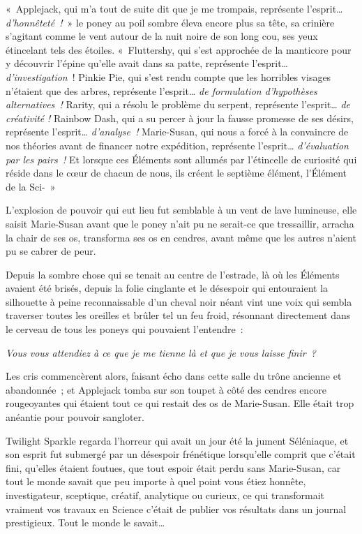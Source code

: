 «~Applejack, qui m'a tout de suite dit que je me trompais, représente l'esprit…
\emph{d'honnêteté~!}~» le poney au poil sombre éleva encore plus sa tête, sa crinière s'agitant comme le vent autour de la nuit noire de son long cou, ses yeux étincelant tels des étoiles.
«~Fluttershy, qui s'est approchée de la manticore pour y découvrir l'épine qu'elle avait dans sa patte, représente l'esprit…
\emph{d'investigation}~!
Pinkie Pie, qui s'est rendu compte que les horribles visages n'étaient que des arbres, représente l'esprit…
\emph{de formulation d'hypothèses alternatives~!} Rarity, qui a résolu le problème du serpent, représente l'esprit…
\emph{de créativité} \emph{!} Rainbow Dash, qui a su percer à jour la fausse promesse de ses désirs, représente l'esprit…
\emph{d'analyse~!} Marie-Susan, qui nous a forcé à la convaincre de nos théories avant de financer notre expédition, représente l'esprit…
\emph{d'évaluation par les pairs~!} Et lorsque ces Éléments sont allumés par l'étincelle de curiosité qui réside dans le cœur de chacun de nous, ils créent le septième élément, l'Élément de la Sci-~»

L'explosion de pouvoir qui eut lieu fut semblable à un vent de lave lumineuse, elle saisit Marie-Susan avant que le poney n'ait pu ne serait-ce que tressaillir, arracha la chair de ses os, transforma ses os en cendres, avant même que les autres n'aient pu se cabrer de peur.

Depuis la sombre chose qui se tenait au centre de l'estrade, là où les Éléments avaient été brisés, depuis la folie cinglante et le désespoir qui entouraient la silhouette à peine reconnaissable d'un cheval noir néant vint une voix qui sembla traverser toutes les oreilles et brûler tel un feu froid, résonnant directement dans le cerveau de tous les poneys qui pouvaient l'entendre~:

\emph{Vous vous attendiez à ce que je me tienne là et que je vous laisse finir~?}

Les cris commencèrent alors, faisant écho dans cette salle du trône ancienne et abandonnée~; et Applejack tomba sur son toupet à côté des cendres encore rougeoyantes qui étaient tout ce qui restait des os de Marie-Susan.
Elle était trop anéantie pour pouvoir sangloter.

Twilight Sparkle regarda l'horreur qui avait un jour été la jument Séléniaque, et son esprit fut submergé par un désespoir frénétique lorsqu'elle comprit que c'était fini, qu'elles étaient foutues, que tout espoir était perdu sans Marie-Susan, car tout le monde savait que peu importe à quel point vous étiez honnête, investigateur, sceptique, créatif, analytique ou curieux, ce qui transformait vraiment vos travaux en Science c'était de publier vos résultats dans un journal prestigieux.
Tout le monde le savait…

